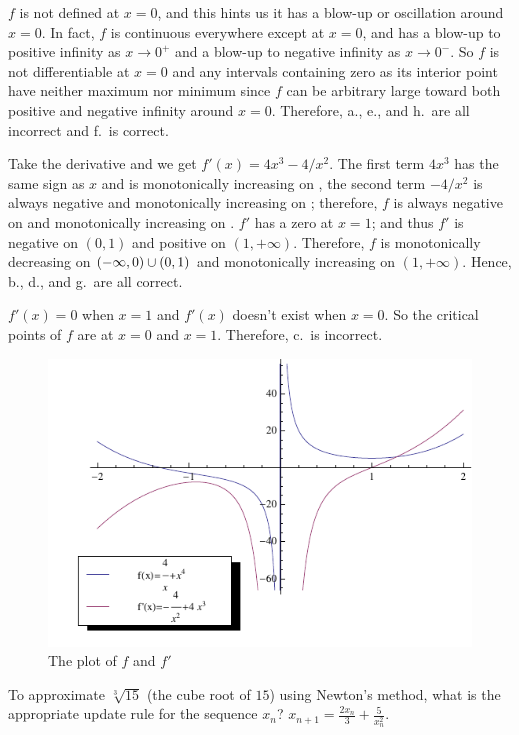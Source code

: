     {\parasp $f$ is not defined at $x=0$, and this hints us it has a
    blow-up or oscillation around $x=0$. In fact, $f$ is continuous
    everywhere except at $x=0$, and has a blow-up to positive infinity
    as $x \to 0^+$ and a blow-up to negative infinity as $x \to
    0^-$. So $f$ is not differentiable at $x=0$ and any intervals
    containing zero as its interior point have neither maximum nor
    minimum since $f$ can be arbitrary large toward both positive and
    negative infinity around $x=0$. Therefore, a., e., and h.\ are
    all incorrect and f.\ is correct.
    
    Take the derivative and we get $f'(x) = 4x^3 - 4/x^2$. The first term
    $4x^3$ has the same sign as $x$ and is monotonically increasing on \R,
    the second term $-4/x^2$ is always negative and monotonically
    increasing on \Rp; therefore, $f$ is always negative on \Rm{} and
    monotonically increasing on \Rp. $f'$ has a zero at $x=1$; and thus
    $f'$ is negative on $(0,1)$ and positive on $(1, +\infty)$. Therefore,
    $f$ is monotonically decreasing on $(-\infty,0) \cup (0,1)$ and monotonically
    increasing on $(1,+\infty)$. Hence, b., d., and g.\ are all correct.
    
    $f'(x) = 0$ when $x=1$ and $f'(x)$ doesn't exist when $x=0$. So
    the critical points of $f$ are at $x=0$ and $x=1$. Therefore, c.\
    is incorrect.}
    
    \begin{figure}[h]
      \centering
      \includegraphics{quiz2_solved_fig3}
      \caption{The plot of $f$ and $f'$}
    \end{figure}
  
    {To approximate $ \sqrt[3]{15} $ (the cube root of $ 15 $) using Newton's
    method, what is the appropriate update rule for the sequence $ x_n $?}
    {$ x_{n+1} = \frac{2x_n}{3} + \frac{5}{x_n^2} $.}
    
